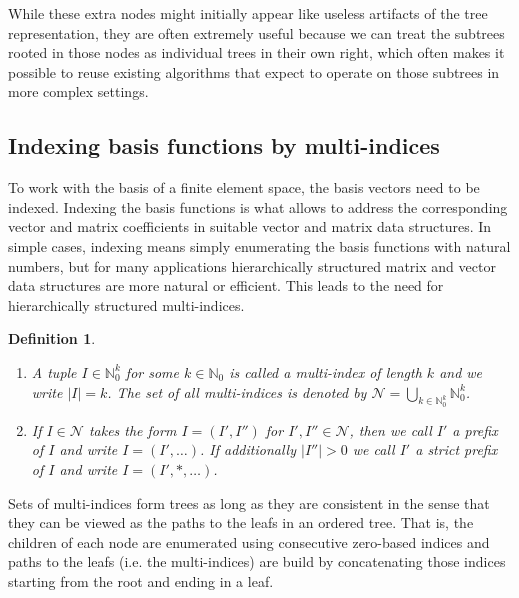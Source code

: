 \documentclass[a4paper,10pt,headings=normal,bibliography=totoc]{scrartcl}
\newtheorem{definition}{Definition}
\newcommand{\N}{\mathbb{N}}
\begin{document}
While these extra nodes might initially appear like useless artifacts of the tree representation, they are often extremely useful
because we can treat the subtrees rooted in those nodes as individual trees in their own right, which often makes it possible to
reuse existing algorithms that expect to operate on those subtrees in more complex settings.




\subsection{Indexing basis functions by multi-indices}

To work with the basis of a finite element space, the basis vectors need to be indexed.  Indexing the basis functions
is what allows to address the corresponding vector and matrix coefficients in suitable vector and matrix data structures.
In simple cases, indexing means simply enumerating the basis functions with natural numbers, but for many applications
hierarchically structured matrix and vector data structures are more natural or efficient.  This leads to the need
for hierarchically structured multi-indices.

\begin{definition}
    \begin{enumerate}
        \item
            A tuple $I \in \N_0^k$ for some $k \in \N_0$ is called a multi-index of length $k$
            and we write $|I|=k$.
            The set of all multi-indices is denoted by
            $\mathcal{N} = \bigcup_{k \in \N_0^k} \N_0^k$.
        \item
            If $I \in \mathcal{N}$ takes the form $I = (I',I'')$ for $I',I'' \in \mathcal{N}$,
            then we call $I'$ a prefix of $I$ and write $I = (I',\dots)$.
            If additionally $|I''|>0$ we call $I'$ a strict prefix of $I$ and write $I = (I',*,\dots)$.
    \end{enumerate}
\end{definition}

Sets of multi-indices form trees as long as they are consistent in the sense that they
can be viewed as the paths to the leafs in an ordered tree.
That is, the children of each node are enumerated using consecutive zero-based
indices and paths to the leafs (i.e. the multi-indices) are build by concatenating
those indices starting from the root and ending in a leaf.
\end{document}
